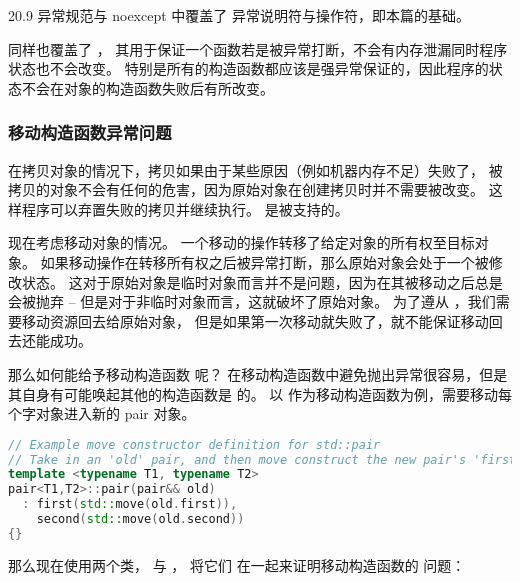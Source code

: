 \documentclass[../../LearnCpp.tex]{subfiles}
\begin{document}

20.9 异常规范与 noexcept 中覆盖了  异常说明符与操作符，即本篇的基础。

同样也覆盖了 ，
其用于保证一个函数若是被异常打断，不会有内存泄漏同时程序状态也不会改变。
特别是所有的构造函数都应该是强异常保证的，因此程序的状态不会在对象的构造函数失败后有所改变。

\subsubsection*{移动构造函数异常问题}

在拷贝对象的情况下，拷贝如果由于某些原因（例如机器内存不足）失败了，
被拷贝的对象不会有任何的危害，因为原始对象在创建拷贝时并不需要被改变。
这样程序可以弃置失败的拷贝并继续执行。
 是被支持的。

现在考虑移动对象的情况。
一个移动的操作转移了给定对象的所有权至目标对象。
如果移动操作在转移所有权之后被异常打断，那么原始对象会处于一个被修改状态。
这对于原始对象是临时对象而言并不是问题，因为在其被移动之后总是会被抛弃 --
但是对于非临时对象而言，这就破坏了原始对象。
为了遵从 ，我们需要移动资源回去给原始对象，
但是如果第一次移动就失败了，就不能保证移动回去还能成功。

那么如何能给予移动构造函数  呢？
在移动构造函数中避免抛出异常很容易，但是其自身有可能唤起其他的构造函数是  的。
以  作为移动构造函数为例，需要移动每个字对象进入新的 pair 对象。

\begin{lstlisting}[language=C++]
// Example move constructor definition for std::pair
// Take in an 'old' pair, and then move construct the new pair's 'first' and 'second' subobjects from the 'old' ones
template <typename T1, typename T2>
pair<T1,T2>::pair(pair&& old)
  : first(std::move(old.first)),
    second(std::move(old.second))
{}
\end{lstlisting}

那么现在使用两个类， 与 ，
将它们  在一起来证明移动构造函数的  问题：
\end{document}
